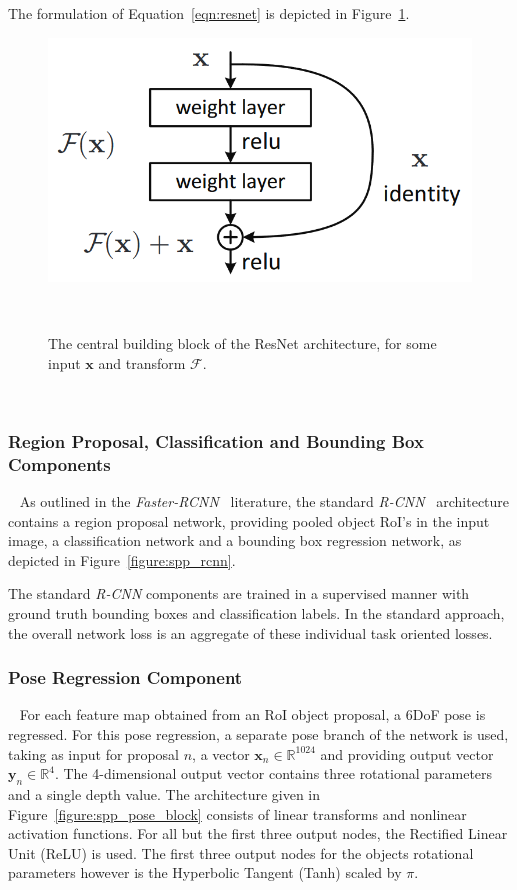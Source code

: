 The formulation of Equation~\ref{eqn:resnet} is depicted in Figure~\ref{figure:resnet_block}.
\begin{figure}[!htbp]
  \centering
  \includegraphics[width=.6\linewidth]{figures/spp/residual_block_he.png}
  \caption[ResNet Block]{The central building block of the ResNet architecture\footnotemark, for some input \( \bm{x} \) and 
  transform \( \mathcal{F} \).}
~\label{figure:resnet_block}
\end{figure}
~

\subsubsection{Region Proposal, Classification and Bounding Box Components}
~\label{subsub:spp_neural_rpn}
As outlined in the \textit{Faster-RCNN}~\cite{He2017} literature, the standard 
\textit{R-CNN}~\cite{Girshick2014,Girshick2015_2} architecture contains a region proposal 
network, providing pooled object RoI's in the input image, a classification network and 
a bounding box regression network, as depicted in Figure~\ref{figure:spp_rcnn}.

The standard \textit{R-CNN} components are trained in a supervised manner with ground truth 
bounding boxes and classification labels. In the standard approach, the overall network loss 
is an aggregate of these individual task oriented losses.

\subsubsection{Pose Regression Component}
~\label{subsub:spp_neural_pose}
For each feature map obtained from an RoI object proposal, a 6DoF pose is regressed. For this 
pose regression, a separate pose branch of the network is used, taking as input for proposal \( n \), 
a vector \( \bm{x}_{n} \in \mathbb{R}^{1024} \) and providing output vector \( \bm{y}_{n} \in \mathbb{R}^{4} \). 
The 4-dimensional output vector contains three rotational parameters and a single depth value. The architecture 
given in Figure~\ref{figure:spp_pose_block} consists of linear transforms and nonlinear activation functions. 
For all but the first three output nodes, the Rectified Linear Unit (ReLU) is used. The first three output 
nodes for the objects rotational parameters however is the Hyperbolic Tangent (Tanh) scaled by \( \pi \).

